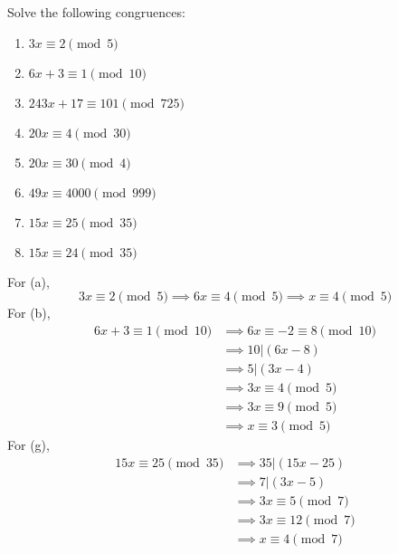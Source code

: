   \begin{exercise}[Shifrin 1.3.20]
    Solve the following congruences:
    \begin{enumerate}[label=\alph*.]
      \item $3x \equiv 2 \pmod{5}$
      \item $6x + 3 \equiv 1 \pmod{10}$
      \item $243x + 17 \equiv 101 \pmod{725}$
      \item $20x \equiv 4 \pmod{30}$
      \item $20x \equiv 30 \pmod{4}$
      \item $49x \equiv 4000 \pmod{999}$
      \item $15x \equiv 25 \pmod{35}$
      \item $15x \equiv 24 \pmod{35}$
    \end{enumerate}
  \end{exercise}
  \begin{solution}
    For (a), 
    \begin{equation}
      3x \equiv 2 \pmod{5} \implies 6x \equiv 4 \pmod{5} \implies x \equiv 4 \pmod{5} 
    \end{equation}
    For (b), 
    \begin{align}
      6x + 3 \equiv 1 \pmod{10} & \implies 6x \equiv -2 \equiv 8 \pmod{10} \\
                                & \implies 10 | (6x - 8) \\
                                & \implies 5 | (3x - 4) \\
                                & \implies 3x \equiv 4 \pmod{5} \\
                                & \implies 3x \equiv 9 \pmod{5} \\
                                & \implies x \equiv 3 \pmod{5}
    \end{align}
    For (g), 
    \begin{align}
      15x \equiv 25 \pmod{35} & \implies 35 | (15x - 25) \\
                              & \implies 7 | (3x - 5) \\
                              & \implies 3x \equiv 5 \pmod{7} \\
                              & \implies 3x \equiv 12 \pmod{7} \\ 
                              & \implies x \equiv 4 \pmod{7}
    \end{align}
  \end{solution}

